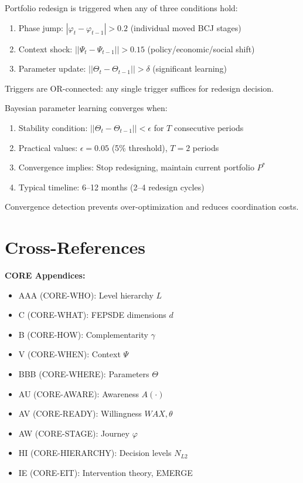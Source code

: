 \begin{theorem}
Portfolio redesign is triggered when any of three conditions hold:
\begin{enumerate}
\item Phase jump: $|\varphi_t - \varphi_{t-1}| > 0.2$ (individual moved BCJ stages)
\item Context shock: $||\Psi_t - \Psi_{t-1}|| > 0.15$ (policy/economic/social shift)
\item Parameter update: $||\Theta_t - \Theta_{t-1}|| > \delta$ (significant learning)
\end{enumerate}
Triggers are OR-connected: any single trigger suffices for redesign decision.
\end{theorem}

\begin{theorem}
Bayesian parameter learning converges when:
\begin{enumerate}
\item Stability condition: $||\Theta_t - \Theta_{t-1}|| < \epsilon$ for $T$ consecutive periods
\item Practical values: $\epsilon = 0.05$ (5\% threshold), $T = 2$ periods
\item Convergence implies: Stop redesigning, maintain current portfolio $P^*$
\item Typical timeline: 6--12 months (2--4 redesign cycles)
\end{enumerate}
Convergence detection prevents over-optimization and reduces coordination costs.
\end{theorem}

\section{Cross-References}
\label{sec:mp-crossref}

\textbf{CORE Appendices:}
\begin{itemize}[nosep]
\item AAA (CORE-WHO): Level hierarchy $L$
\item C (CORE-WHAT): FEPSDE dimensions $d$
\item B (CORE-HOW): Complementarity $\gamma$
\item V (CORE-WHEN): Context $\Psi$
\item BBB (CORE-WHERE): Parameters $\Theta$
\item AU (CORE-AWARE): Awareness $A(\cdot)$
\item AV (CORE-READY): Willingness $WAX, \theta$
\item AW (CORE-STAGE): Journey $\varphi$
\item HI (CORE-HIERARCHY): Decision levels $N_{L2}$
\item IE (CORE-EIT): Intervention theory, EMERGE
\end{itemize}

